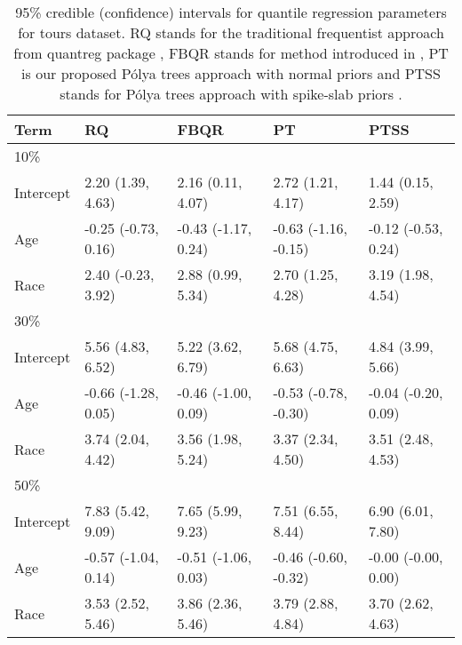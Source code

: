 \documentclass[12pt]{article}
\newcommand{\polya}{P\'{o}lya}
\begin{document}
\begin{table}[h]
  \caption[]{\label{tab:tours} 95\% credible (confidence) intervals for
    quantile regression parameters for tours dataset. RQ stands for the
    traditional frequentist approach from quantreg package \citep{quantreg}, FBQR stands for method introduced in \cite{reich2010},
    PT is our proposed \polya{} trees approach with normal priors and PTSS stands for
    \polya{} trees approach with spike-slab priors .}
  \vspace{4mm}

  \centering
  \begin{tabular}[tb]{lllll}
    \toprule
    Term  & RQ                   & FBQR                 & PT                   & PTSS                 \\
    \hline
    10\%  &                      &                      &                      &                      \\
    Intercept & 2.20 (1.39, 4.63)    & 2.16 (0.11, 4.07)    & 2.72 (1.21, 4.17)    & 1.44 (0.15, 2.59)    \\
    Age       & -0.25 (-0.73, 0.16)  & -0.43 (-1.17, 0.24)  & -0.63 (-1.16, -0.15) & -0.12 (-0.53, 0.24)  \\
    Race      & 2.40 (-0.23, 3.92)   & 2.88 (0.99, 5.34)    & 2.70 (1.25, 4.28)    & 3.19 (1.98, 4.54)    \\
    \hline
    30\%      &                      &                      &                      &                      \\
    Intercept & 5.56 (4.83, 6.52)    & 5.22 (3.62, 6.79)    & 5.68 (4.75, 6.63)    & 4.84 (3.99, 5.66)    \\
    Age       & -0.66 (-1.28, 0.05)  & -0.46 (-1.00, 0.09)  & -0.53 (-0.78, -0.30) & -0.04 (-0.20, 0.09)  \\
    Race      & 3.74 (2.04, 4.42)    & 3.56 (1.98, 5.24)    & 3.37 (2.34, 4.50)    & 3.51 (2.48, 4.53)    \\
    \hline
    50\%      &                      &                      &                      &                      \\
    Intercept & 7.83 (5.42, 9.09)    & 7.65 (5.99, 9.23)    & 7.51 (6.55, 8.44)    & 6.90 (6.01, 7.80)    \\
    Age       & -0.57 (-1.04, 0.14)  & -0.51 (-1.06, 0.03)  & -0.46 (-0.60, -0.32) & -0.00 (-0.00, 0.00)  \\
    Race      & 3.53 (2.52, 5.46)    & 3.86 (2.36, 5.46)    & 3.79 (2.88, 4.84)    & 3.70 (2.62, 4.63)    \\

\end{tabular}
\end{table}
\end{document}
